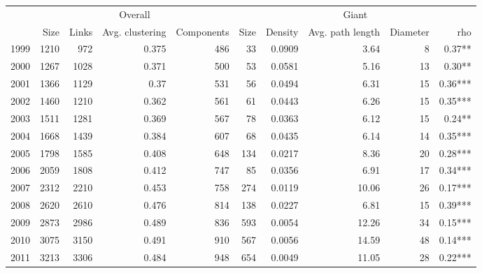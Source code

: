 \begin{tabular}{lrrrr|rrrrr}
\toprule
{} & \multicolumn{4}{c}{Overall} & \multicolumn{5}{c}{Giant} \\
{} &    Size & Links & Avg. clustering & Components &  Size & Density & Avg. path length & Diameter &      rho \\
\midrule
1999 &    1210 &   972 &           0.375 &        486 &    33 &  0.0909 &             3.64 &        8 &   0.37** \\
2000 &    1267 &  1028 &           0.371 &        500 &    53 &  0.0581 &             5.16 &       13 &   0.30** \\
2001 &    1366 &  1129 &            0.37 &        531 &    56 &  0.0494 &             6.31 &       15 &  0.36*** \\
2002 &    1460 &  1210 &           0.362 &        561 &    61 &  0.0443 &             6.26 &       15 &  0.35*** \\
2003 &    1511 &  1281 &           0.369 &        567 &    78 &  0.0363 &             6.12 &       15 &   0.24** \\
2004 &    1668 &  1439 &           0.384 &        607 &    68 &  0.0435 &             6.14 &       14 &  0.35*** \\
2005 &    1798 &  1585 &           0.408 &        648 &   134 &  0.0217 &             8.36 &       20 &  0.28*** \\
2006 &    2059 &  1808 &           0.412 &        747 &    85 &  0.0356 &             6.91 &       17 &  0.34*** \\
2007 &    2312 &  2210 &           0.453 &        758 &   274 &  0.0119 &            10.06 &       26 &  0.17*** \\
2008 &    2620 &  2610 &           0.476 &        814 &   138 &  0.0227 &             6.81 &       15 &  0.39*** \\
2009 &    2873 &  2986 &           0.489 &        836 &   593 &  0.0054 &            12.26 &       34 &  0.15*** \\
2010 &    3075 &  3150 &           0.491 &        910 &   567 &  0.0056 &            14.59 &       48 &  0.14*** \\
2011 &    3213 &  3306 &           0.484 &        948 &   654 &  0.0049 &            11.05 &       28 &  0.22*** \\
\bottomrule
\end{tabular}
